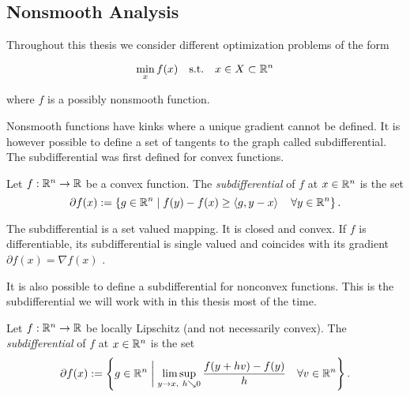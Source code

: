 

\subsection{Nonsmooth Analysis}

Throughout this thesis we consider different optimization problems of the form

\begin{equation*}
\min_{x} f(x) \quad \text{s.t.} \quad x \in X \subset \mathbb{R}^n
\label{min_prob}
\end{equation*}

where \(f\) is a possibly nonsmooth function.


Nonsmooth functions have kinks where a unique gradient cannot be defined. It is however possible to define a set of tangents to the graph called subdifferential.
The subdifferential was first defined for convex functions.

\begin{definition}
\label{conv_subdiff}
	Let \(f: \mathbb{R}^n \to \mathbb{R} \) be a convex function. The \emph{subdifferential} of \(f\) at \(x\in \mathbb{R}^n\) is the set 
	\[ \partial f(x) := \left\{g \in \mathbb{R}^n \mid f(y)-f(x) \geq \left\langle g,y-x \right\rangle \quad \forall y \in \mathbb{R}^n \right\}. \]
\end{definition}

The subdifferential is a set valued mapping. It is closed and convex. If \(f\) is differentiable, its subdifferential is single valued and coincides with its gradient \(\partial f(x) = {\nabla f(x)}\) \cite{Rockafellar1970}.


It is also possible to define a subdifferential for nonconvex functions. This is the subdifferential we will work with in this thesis most of the time.

\begin{definition}
\label{nonconv_subdiff}
	Let \(f: \mathbb{R}^n \to \mathbb{R}\) be locally Lipschitz (and not necessarily convex).
	The \emph{subdifferential} of \(f\) at \(x \in \mathbb{R}^n\) is the set
\[ \partial f(x) := \left\{g \in \mathbb{R}^n \biggm| \limsup_{y \to x,~ h \searrow 0}\frac{f(y+hv)-f(y)}{h} \quad \forall v \in \mathbb{R}^n \right\}. \]
\end{definition} 

